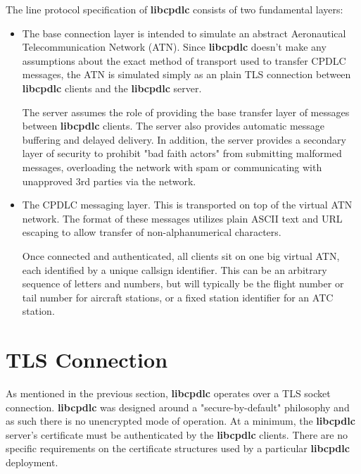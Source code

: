 \documentclass[a4paper,12pt]{article}
\newcommand{\libcpdlc}{\textbf{libcpdlc}\xspace}
\begin{document}
\noindent The line protocol specification of \libcpdlc consists of two
fundamental layers:

\begin{itemize}

\item The base connection layer is intended to simulate an abstract
Aeronautical Telecommunication Network (ATN). Since \libcpdlc doesn't
make any assumptions about the exact method of transport used to transfer
CPDLC messages, the ATN is simulated simply as an plain TLS connection
between \libcpdlc clients and the \libcpdlc server.

The server assumes the role of providing the base transfer layer of
messages between \libcpdlc clients. The server also provides automatic
message buffering and delayed delivery. In addition, the server provides
a secondary layer of security to prohibit "bad faith actors" from
submitting malformed messages, overloading the network with spam or
communicating with unapproved 3rd parties via the network.

\item The CPDLC messaging layer. This is transported on top of the
virtual ATN network. The format of these messages utilizes plain ASCII
text and URL escaping to allow transfer of non-alphanumerical characters.

Once connected and authenticated, all clients sit on one big virtual ATN,
each identified by a unique callsign identifier. This can be an arbitrary
sequence of letters and numbers, but will typically be the flight number
or tail number for aircraft stations, or a fixed station identifier for
an ATC station.

\end{itemize}

\newpage

\section{TLS Connection}

As mentioned in the previous section, \libcpdlc operates over a TLS
socket connection. \libcpdlc was designed around a "secure-by-default"
philosophy and as such there is no unencrypted mode of operation. At a
minimum, the \libcpdlc server's certificate must be authenticated by the
\libcpdlc clients. There are no specific requirements on the certificate
structures used by a particular \libcpdlc deployment.
\end{document}

